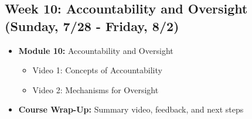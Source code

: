 \documentclass[11pt, letterpaper]{article}
\begin{document}
\subsection*{Week 10: Accountability and Oversight (Sunday, 7/28 - Friday, 8/2)}
\begin{itemize}
    \item \textbf{Module 10:} Accountability and Oversight
    \begin{itemize}
        \item Video 1: Concepts of Accountability
        \item Video 2: Mechanisms for Oversight
    \end{itemize}
    \item \textbf{Course Wrap-Up:} Summary video, feedback, and next steps
\end{itemize}
\end{document}
